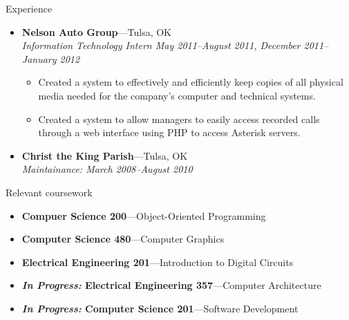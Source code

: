 \documentclass[10pt,oneside]{article}
\newenvironment{ressection}[1]{
	\vspace{4pt}
	{\fontfamily{phv}\selectfont\Large#1}
	\begin{itemize}
	\vspace{3pt}
}{
	\end{itemize}
}
\newcommand{\ressubitem}[1]{
	\vspace{-1pt}
	\item \begin{flushleft} #1 \end{flushleft}
}
\newcommand{\resbigitem}[3]{
	\vspace{-5pt}
	\item
	\textbf{#1}---#2 \\
	\textit{#3}
}
\newcommand{\resshortbigitem}[2]{
	\vspace{-5pt}
	\item
	\textbf{#1}---#2
}
\newenvironment{ressubsec}[3]{
	\resbigitem{#1}{#2}{#3}
	\vspace{-2pt}
	\begin{itemize}
}{
	\end{itemize}
}
\begin{document}
\begin{ressection}{Experience}
	\begin{comment}
	\begin{ressubsec}{Car Country}{Tulsa, OK}{Currier December 2010--January 2011 (Winter Break)}
		\ressubitem{Transported documents and payments to and from businesses and banks.}
	\end{ressubsec}
	\end{comment}
	\begin{ressubsec}{Nelson Auto Group}{Tulsa, OK}{Information Technology Intern May 2011--August 2011, December 2011--January 2012}
		\ressubitem{Created a system to effectively and efficiently keep copies of all physical media needed for the company's computer and technical systems.}
		\ressubitem{Created a system to allow managers to easily access recorded calls through a web interface using PHP to access Asterisk servers.}
	\end{ressubsec}
	\resbigitem{Christ the King Parish}{Tulsa, OK}{Maintainance:  March 2008--August 2010}
	
	\begin{comment}
	\begin{ressubsec}{Tulsa Day Center For the Homeless}{Tulsa, OK}{Volunteer:  July 2006--September 2009}
		\ressubitem{Worked mainly with individuals receiving tuberculosis tests.}
		\ressubitem{Entered tuberculosis data and kept computerized records between the Day Center for the Homeless and the Tulsa City-County Health Department up to date.}
	\end{ressubsec}
	\end{comment}

\end{ressection}

\begin{ressection}{Relevant coursework}
	\resshortbigitem{Compuer Science 200}{Object-Oriented Programming}
	\resshortbigitem{Computer Science 480}{Computer Graphics}
	\resshortbigitem{Electrical Engineering 201}{Introduction to Digital Circuits}
	\resshortbigitem{\emph{In Progress:} Electrical Engineering 357}{Computer Architecture}
	\resshortbigitem{\emph{In Progress:} Computer Science 201}{Software Development}
\end{ressection}
\end{document}
